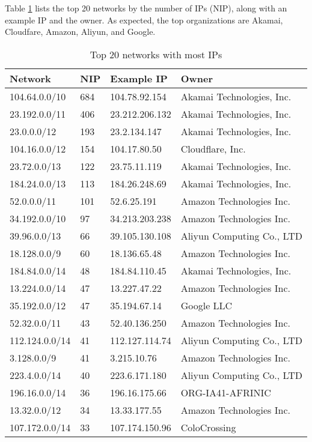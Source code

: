 \documentclass[11pt]{article}
\begin{document}
Table \ref{tbl:net20} lists the top 20 networks by the number of IPs (NIP),
along with an example IP and the owner.
As expected, the top organizations are Akamai, Cloudfare, Amazon, Aliyun,
and Google.

\begin{table}[]
\centering
\caption{\label{tbl:net20}
Top 20 networks with most IPs}
\begin{tabular}{|l|l|l|l|}
\hline
Network        & NIP & Example IP     & Owner                     \\ \hline
104.64.0.0/10  & 684 & 104.78.92.154  & Akamai Technologies, Inc. \\ \hline
23.192.0.0/11  & 406 & 23.212.206.132 & Akamai Technologies, Inc. \\ \hline
23.0.0.0/12    & 193 & 23.2.134.147   & Akamai Technologies, Inc. \\ \hline
104.16.0.0/12  & 154 & 104.17.80.50   & Cloudflare, Inc.          \\ \hline
23.72.0.0/13   & 122 & 23.75.11.119   & Akamai Technologies, Inc. \\ \hline
184.24.0.0/13  & 113 & 184.26.248.69  & Akamai Technologies, Inc. \\ \hline
52.0.0.0/11    & 101 & 52.6.25.191    & Amazon Technologies Inc.  \\ \hline
34.192.0.0/10  & 97  & 34.213.203.238 & Amazon Technologies Inc.  \\ \hline
39.96.0.0/13   & 66  & 39.105.130.108 & Aliyun Computing Co., LTD \\ \hline
18.128.0.0/9   & 60  & 18.136.65.48   & Amazon Technologies Inc.  \\ \hline
184.84.0.0/14  & 48  & 184.84.110.45  & Akamai Technologies, Inc. \\ \hline
13.224.0.0/14  & 47  & 13.227.47.22   & Amazon Technologies Inc.  \\ \hline
35.192.0.0/12  & 47  & 35.194.67.14   & Google LLC                \\ \hline
52.32.0.0/11   & 43  & 52.40.136.250  & Amazon Technologies Inc.  \\ \hline
112.124.0.0/14 & 41  & 112.127.114.74 & Aliyun Computing Co., LTD \\ \hline
3.128.0.0/9    & 41  & 3.215.10.76    & Amazon Technologies Inc.  \\ \hline
223.4.0.0/14   & 40  & 223.6.171.180  & Aliyun Computing Co., LTD \\ \hline
196.16.0.0/14  & 36  & 196.16.175.66  & ORG-IA41-AFRINIC          \\ \hline
13.32.0.0/12   & 34  & 13.33.177.55   & Amazon Technologies Inc.  \\ \hline
107.172.0.0/14 & 33  & 107.174.150.96 & ColoCrossing              \\ \hline
\end{tabular}
\end{table}
\end{document}
